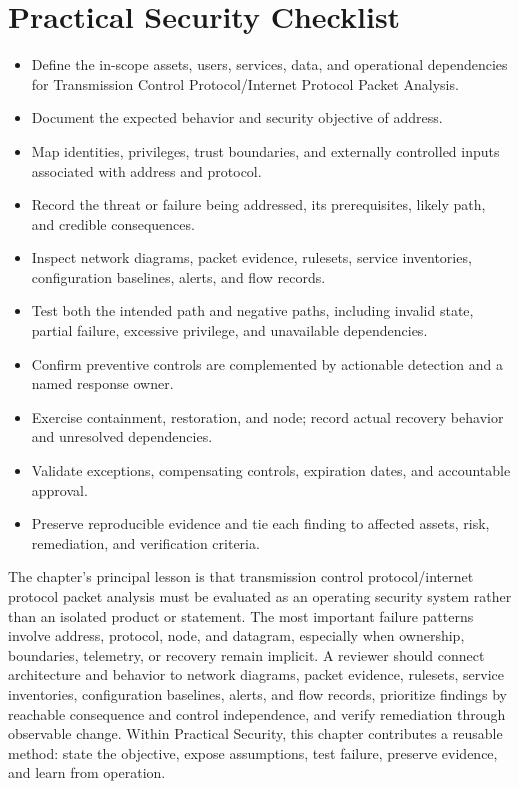 \documentclass[11pt]{article}
\begin{document}
\section*{Practical Security Checklist}
\begin{itemize}[label=$\square$]
\item Define the in-scope assets, users, services, data, and operational dependencies for Transmission Control Protocol/Internet Protocol Packet Analysis.
\item Document the expected behavior and security objective of address.
\item Map identities, privileges, trust boundaries, and externally controlled inputs associated with address and protocol.
\item Record the threat or failure being addressed, its prerequisites, likely path, and credible consequences.
\item Inspect network diagrams, packet evidence, rulesets, service inventories, configuration baselines, alerts, and flow records.
\item Test both the intended path and negative paths, including invalid state, partial failure, excessive privilege, and unavailable dependencies.
\item Confirm preventive controls are complemented by actionable detection and a named response owner.
\item Exercise containment, restoration, and node; record actual recovery behavior and unresolved dependencies.
\item Validate exceptions, compensating controls, expiration dates, and accountable approval.
\item Preserve reproducible evidence and tie each finding to affected assets, risk, remediation, and verification criteria.
\end{itemize}
\begin{synthesisbox}
The chapter's principal lesson is that transmission control protocol/internet protocol packet analysis must be evaluated as an operating security system rather than an isolated product or statement. The most important failure patterns involve address, protocol, node, and datagram, especially when ownership, boundaries, telemetry, or recovery remain implicit. A reviewer should connect architecture and behavior to network diagrams, packet evidence, rulesets, service inventories, configuration baselines, alerts, and flow records, prioritize findings by reachable consequence and control independence, and verify remediation through observable change. Within Practical Security, this chapter contributes a reusable method: state the objective, expose assumptions, test failure, preserve evidence, and learn from operation.
\end{synthesisbox}
\end{document}
